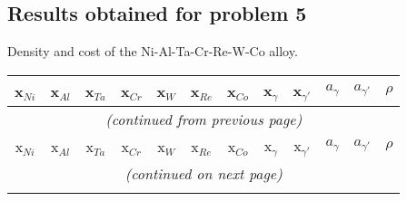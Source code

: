 \subsection{Results obtained for problem 5}

Density and cost of the Ni-Al-Ta-Cr-Re-W-Co alloy.

\begin{longtable}{rrrrrrrrrrrr}
    \multicolumn{1}{c}{x$_{Ni}$} & \multicolumn{1}{c}{x$_{Al}$} & \multicolumn{1}{c}{x$_{Ta}$} & \multicolumn{1}{c}{x$_{Cr}$} & \multicolumn{1}{c}{x$_{W}$} & \multicolumn{1}{c}{x$_{Re}$} & \multicolumn{1}{c}{x$_{Co}$} & \multicolumn{1}{c}{x$_{\gamma}$} & \multicolumn{1}{c}{x$_{\gamma'}$} & \multicolumn{1}{c}{$a_\gamma$} & \multicolumn{1}{c}{$a_{\gamma'}$} & \multicolumn{1}{c}{$\rho$} \\ \hline \hline
    \endfirsthead
    
    \multicolumn{12}{c}{\textit{(continued from previous page)}} \\
    \multicolumn{1}{c}{x$_{Ni}$} & \multicolumn{1}{c}{x$_{Al}$} & \multicolumn{1}{c}{x$_{Ta}$} & \multicolumn{1}{c}{x$_{Cr}$} & \multicolumn{1}{c}{x$_{W}$} & \multicolumn{1}{c}{x$_{Re}$} & \multicolumn{1}{c}{x$_{Co}$} & \multicolumn{1}{c}{x$_{\gamma}$} & \multicolumn{1}{c}{x$_{\gamma'}$} & \multicolumn{1}{c}{$a_\gamma$} & \multicolumn{1}{c}{$a_{\gamma'}$} & \multicolumn{1}{c}{$\rho$} \\ \hline \hline
    \endhead
    
    \multicolumn{12}{c}{\textit{(continued on next page)}} \\
    \endfoot
    
    \endlastfoot
    

\end{longtable}
